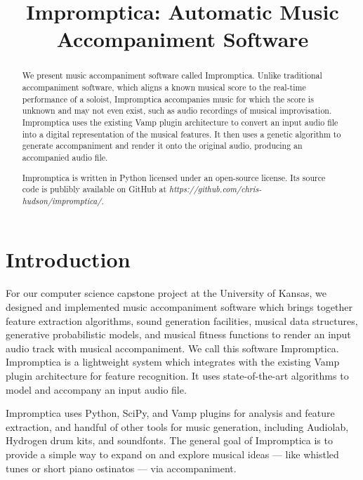\documentclass[11pt,conference,letterpaper]{IEEEtran}
\begin{document}
\title{Impromptica: Automatic Music Accompaniment Software}
\author{}

\maketitle

\begin{abstract}
We present music accompaniment software called Impromptica. Unlike traditional accompaniment software, which aligns a known musical score to the real-time performance of a soloist, Impromptica accompanies music for which the score is unknown and may not even exist, such as audio recordings of musical improvisation. Impromptica uses the existing Vamp plugin architecture to convert an input audio file into a digital representation of the musical features. It then uses a genetic algorithm to generate accompaniment and render it onto the original audio, producing an accompanied audio file.

Impromptica is written in Python licensed under an open-source license. Its source code is publibly available on GitHub at \emph{https://github.com/chris-hudson/impromptica/}.


\end{abstract}

\section{Introduction}

For our computer science capstone project at the University of Kansas, we designed and implemented music accompaniment software which brings together feature extraction algorithms, sound generation facilities, musical data structures, generative probabilistic models, and musical fitness functions to render an input audio track with musical accompaniment. We call this software Impromptica. Impromptica is a lightweight system which integrates with the existing Vamp plugin architecture for feature recognition. It uses state-of-the-art algorithms to model and accompany an input audio file.

Impromptica uses Python, SciPy, and Vamp plugins for analysis and feature extraction, and handful of other tools for music generation, including Audiolab, Hydrogen drum kits, and soundfonts. The general goal of Impromptica is to provide a simple way to expand on and explore musical ideas --- like whistled tunes or short piano ostinatos --- via accompaniment.
\end{document}
